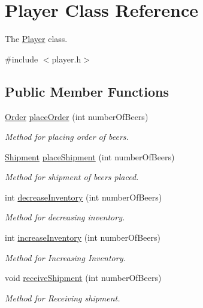 \hypertarget{classPlayer}{}\section{Player Class Reference}
\label{classPlayer}


The \hyperlink{classPlayer}{Player} class.  




{\ttfamily \#include $<$player.\+h$>$}

\subsection*{Public Member Functions}
\begin{DoxyCompactItemize}
\item 
\hyperlink{classOrder}{Order} \hyperlink{classPlayer_a698698a4fc4ae46e2ee5085e1b132ee0}{place\+Order} (int number\+Of\+Beers)
\begin{DoxyCompactList}\small\item\em Method for placing order of beers. \end{DoxyCompactList}\item 
\hyperlink{classShipment}{Shipment} \hyperlink{classPlayer_abab9379aa93644769bbd93767f9eebdc}{place\+Shipment} (int number\+Of\+Beers)
\begin{DoxyCompactList}\small\item\em Method for shipment of beers placed. \end{DoxyCompactList}\item 
int \hyperlink{classPlayer_ae2197d1061a24fa444129b5ea85996d5}{decrease\+Inventory} (int number\+Of\+Beers)
\begin{DoxyCompactList}\small\item\em Method for decreasing inventory. \end{DoxyCompactList}\item 
int \hyperlink{classPlayer_af67e6ee0de38f3e9635d35849f103449}{increase\+Inventory} (int number\+Of\+Beers)
\begin{DoxyCompactList}\small\item\em Method for Increasing Inventory. \end{DoxyCompactList}\item 
void \hyperlink{classPlayer_ae1a59b99f054470c0e2fde589a29a559}{receive\+Shipment} (int number\+Of\+Beers)
\begin{DoxyCompactList}\small\item\em Method for Receiving shipment. \end{DoxyCompactList}\item 

\end{DoxyCompactItemize}
